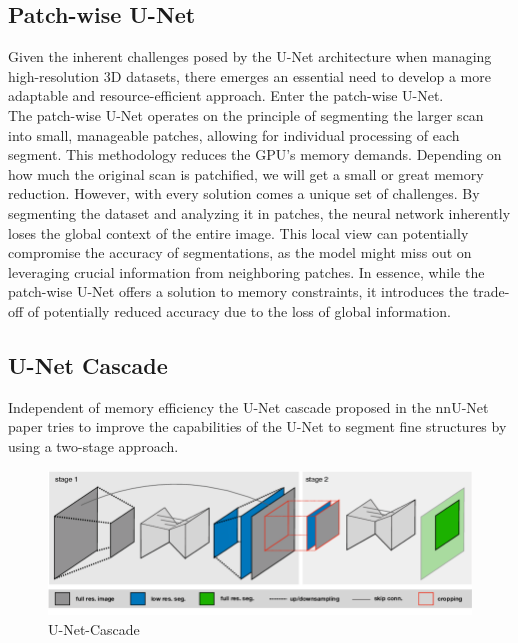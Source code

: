 \subsection{Patch-wise U-Net}
Given the inherent challenges posed by the U-Net architecture when managing high-resolution $3$D datasets, there emerges an essential need to develop a more adaptable and resource-efficient approach.
Enter the patch-wise U-Net.\\[1ex]
The patch-wise U-Net operates on the principle of segmenting the larger scan into small, manageable patches, allowing for individual processing of each segment\cite[5-7]{lee_automatic_2020}.
This methodology reduces the GPU's memory demands. Depending on how much the original scan is patchified, we will get a small or great memory reduction. However, with every solution comes a unique set of challenges.
By segmenting the dataset and analyzing it in patches, the neural network inherently loses the global context of the entire image.
This local view can potentially compromise the accuracy of segmentations, as the model might miss out on leveraging crucial information from neighboring patches.
In essence, while the patch-wise U-Net offers a solution to memory constraints, it introduces the trade-off of potentially reduced accuracy due to the loss of global information.

\subsection{U-Net Cascade}
Independent of memory efficiency the U-Net cascade proposed in the nnU-Net paper\cite{isensee_nnu-net_2018} tries to improve the capabilities of the U-Net to segment fine structures by using a two-stage approach.

\begin{figure}[H]
	\centering
	\includegraphics[width=1\linewidth]{images/UNet-Cascade}
	\caption{U-Net-Cascade\cite[4]{isensee_nnu-net_2018}}
	\label{fig:UNet-Cascade}
\end{figure}

